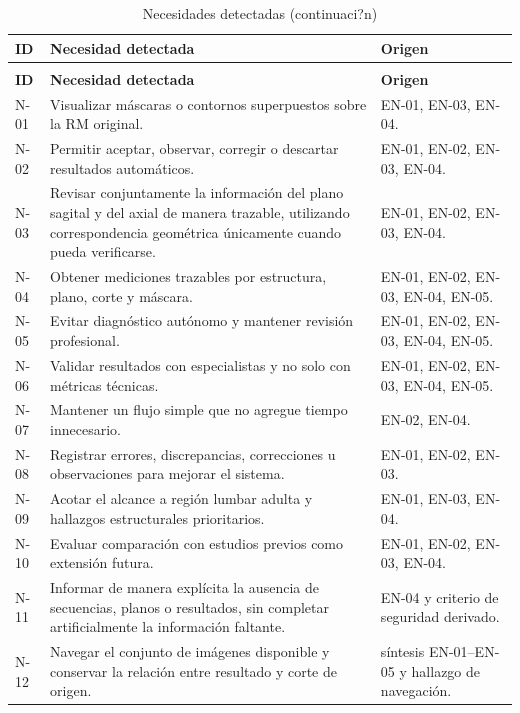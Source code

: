 {\small
\setlength{\LTleft}{0pt}
\setlength{\LTright}{0pt}
\renewcommand{\arraystretch}{1.18}
\begin{longtable}{p{} p{} p{}}
\caption{Necesidades detectadas}\label{tab:user-research-necesidades}\\
\hline
\textbf{ID} & \textbf{Necesidad detectada} & \textbf{Origen} \\
\hline
\endfirsthead
\caption[]{Necesidades detectadas (continuaci?n)}\\
\hline
\textbf{ID} & \textbf{Necesidad detectada} & \textbf{Origen} \\
\hline
\endhead
\hline
\endfoot
N-01 & Visualizar máscaras o contornos superpuestos sobre la RM original. & EN-01, EN-03, EN-04. \\
N-02 & Permitir aceptar, observar, corregir o descartar resultados automáticos. & EN-01, EN-02, EN-03, EN-04. \\
N-03 & Revisar conjuntamente la información del plano sagital y del axial de manera trazable, utilizando correspondencia geométrica únicamente cuando pueda verificarse. & EN-01, EN-02, EN-03, EN-04. \\
N-04 & Obtener mediciones trazables por estructura, plano, corte y máscara. & EN-01, EN-02, EN-03, EN-04, EN-05. \\
N-05 & Evitar diagnóstico autónomo y mantener revisión profesional. & EN-01, EN-02, EN-03, EN-04, EN-05. \\
N-06 & Validar resultados con especialistas y no solo con métricas técnicas. & EN-01, EN-02, EN-03, EN-04, EN-05. \\
N-07 & Mantener un flujo simple que no agregue tiempo innecesario. & EN-02, EN-04. \\
N-08 & Registrar errores, discrepancias, correcciones u observaciones para mejorar el sistema. & EN-01, EN-02, EN-03. \\
N-09 & Acotar el alcance a región lumbar adulta y hallazgos estructurales prioritarios. & EN-01, EN-03, EN-04. \\
N-10 & Evaluar comparación con estudios previos como extensión futura. & EN-01, EN-02, EN-03, EN-04. \\
N-11 & Informar de manera explícita la ausencia de secuencias, planos o resultados, sin completar artificialmente la información faltante. & EN-04 y criterio de seguridad derivado. \\
N-12 & Navegar el conjunto de imágenes disponible y conservar la relación entre resultado y corte de origen. & síntesis EN-01–EN-05 y hallazgo de navegación. \\
\hline
\end{longtable}
}
